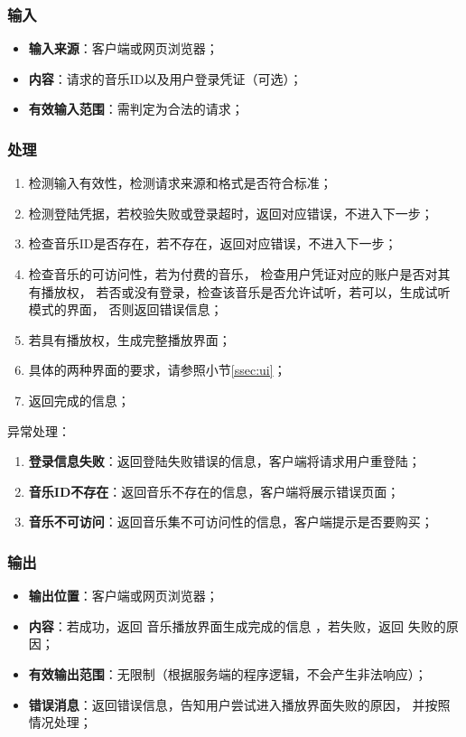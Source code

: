\subsubsection{输入}
	\begin{itemize}
		\item \textbf{输入来源}：客户端或网页浏览器；
		\item \textbf{内容}：请求的音乐ID以及用户登录凭证（可选）；
		\item \textbf{有效输入范围}：需判定为合法的请求；
	\end{itemize}
\subsubsection{处理}
	\begin{enumerate}
		\item 检测输入有效性，检测请求来源和格式是否符合标准；
		\item 检测登陆凭据，若校验失败或登录超时，返回对应错误，不进入下一步；
		\item 检查音乐ID是否存在，若不存在，返回对应错误，不进入下一步；
		\item 检查音乐的可访问性，若为付费的音乐，
			检查用户凭证对应的账户是否对其有播放权，
			若否或没有登录，检查该音乐是否允许试听，若可以，生成试听模式的界面，
			否则返回错误信息；
		\item 若具有播放权，生成完整播放界面；
		\item 具体的两种界面的要求，请参照小节\ref{ssec:ui}；
		\item 返回完成的信息；
	\end{enumerate}
	\noindent 异常处理：
	\begin{enumerate}
		\item \textbf{登录信息失败}：返回登陆失败错误的信息，客户端将请求用户重登陆；
		\item \textbf{音乐ID不存在}：返回音乐不存在的信息，客户端将展示错误页面；
		\item \textbf{音乐不可访问}：返回音乐集不可访问性的信息，客户端提示是否要购买；
	\end{enumerate}
\subsubsection{输出}
\begin{itemize}
	\item \textbf{输出位置}：客户端或网页浏览器；
	\item \textbf{内容}：若成功，返回 音乐播放界面生成完成的信息 ，若失败，返回 失败的原因；
	\item \textbf{有效输出范围}：无限制（根据服务端的程序逻辑，不会产生非法响应）；
	\item \textbf{错误消息}：返回错误信息，告知用户尝试进入播放界面失败的原因，
		并按照情况处理；
\end{itemize}

